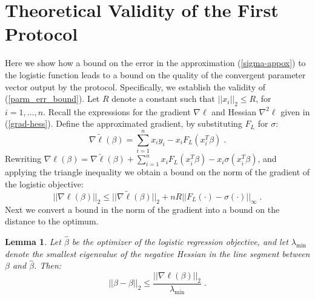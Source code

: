 \documentclass[11pt]{article}
\newcommand{\norm}[1]{||#1||}
\newtheorem{lem}[thm]{Lemma}
\begin{document}
\appendix
\section{Theoretical Validity of the First Protocol}\label{sec:validity_1}

Here we show how a bound on the error in the approximation (\ref{sigma-appox}) to the logistic function leads to a bound on the quality of the convergent parameter vector output by the protocol. Specifically, we establish the validity of (\ref{parm_err_bound}). Let $R$ denote a constant such that $||x_i||_2 \leq R$, for $i=1,\ldots, n$. Recall the expressions for the gradient $\nabla\ell$ and Hessian $\nabla^2\ell$ given in (\ref{grad-hess}). Define the approximated gradient, by substituting $F_L$ for $\sigma$:
\begin{equation}
\nabla\tilde{\ell}(\beta) = \sum_{i=1}^n{x_iy_i-x_iF_L(x_i^T\beta)} \; .\end{equation}
Rewriting $\nabla\ell(\beta) = \nabla\tilde{\ell}(\beta) + \sum_{i=1}^n{x_iF_L(x_i^T\beta) - x_i\sigma(x_i^T\beta)}$,
and applying the triangle inequality we obtain a bound on the norm of the gradient of the logistic objective:
\begin{equation}\label{exactnorm_bound}
\norm{\nabla\ell(\beta)}_2 \leq 
\norm{\nabla\tilde{\ell}(\beta)}_2 + nR\norm{F_L(\cdot)-\sigma(\cdot)}_\infty \; .
\end{equation}
Next we  convert a bound in the norm of the gradient into a bound on the distance to the optimum.  











\begin{lem}\label{lem_meanval}
Let $\hat{\beta}$ be the optimizer of the logistic regression objective, and let $\lambda_{\text{min}}$ denote the smallest eigenvalue of the negative Hessian in the line segment between $\beta$ and $\hat{\beta}$. Then:
\begin{equation}\label{distance_bound} 
||\beta-\hat{\beta}||_2 \leq \frac{||\nabla\ell(\beta)||_2}{\lambda_{\text{min}}}  \; .
\end{equation}
\end{lem}
\end{document}

